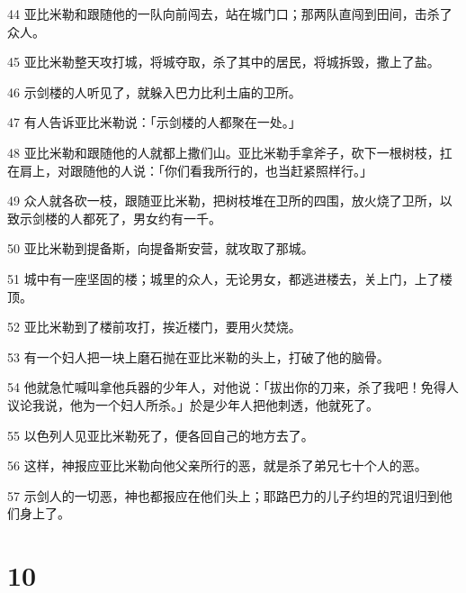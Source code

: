 \par 44 亚比米勒和跟随他的一队向前闯去，站在城门口；那两队直闯到田间，击杀了众人。
\par 45 亚比米勒整天攻打城，将城夺取，杀了其中的居民，将城拆毁，撒上了盐。
\par 46 示剑楼的人听见了，就躲入巴力比利土庙的卫所。
\par 47 有人告诉亚比米勒说：「示剑楼的人都聚在一处。」
\par 48 亚比米勒和跟随他的人就都上撒们山。亚比米勒手拿斧子，砍下一根树枝，扛在肩上，对跟随他的人说：「你们看我所行的，也当赶紧照样行。」
\par 49 众人就各砍一枝，跟随亚比米勒，把树枝堆在卫所的四围，放火烧了卫所，以致示剑楼的人都死了，男女约有一千。
\par 50 亚比米勒到提备斯，向提备斯安营，就攻取了那城。
\par 51 城中有一座坚固的楼；城里的众人，无论男女，都逃进楼去，关上门，上了楼顶。
\par 52 亚比米勒到了楼前攻打，挨近楼门，要用火焚烧。
\par 53 有一个妇人把一块上磨石抛在亚比米勒的头上，打破了他的脑骨。
\par 54 他就急忙喊叫拿他兵器的少年人，对他说：「拔出你的刀来，杀了我吧！免得人议论我说，他为一个妇人所杀。」於是少年人把他刺透，他就死了。
\par 55 以色列人见亚比米勒死了，便各回自己的地方去了。
\par 56 这样，神报应亚比米勒向他父亲所行的恶，就是杀了弟兄七十个人的恶。
\par 57 示剑人的一切恶，神也都报应在他们头上；耶路巴力的儿子约坦的咒诅归到他们身上了。

\chapter{10}

